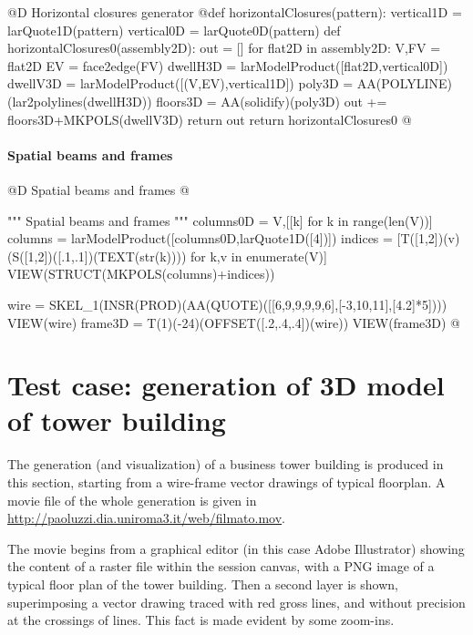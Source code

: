 \documentclass[11pt,oneside]{article}    %
\begin{document}
@D Horizontal closures generator
@{def horizontalClosures(pattern):
    vertical1D = larQuote1D(pattern)
    vertical0D = larQuote0D(pattern)
    def horizontalClosures0(assembly2D):
        out = []
        for flat2D in assembly2D:
            V,FV = flat2D
            EV = face2edge(FV)
            dwellH3D = larModelProduct([flat2D,vertical0D])
            dwellV3D = larModelProduct([(V,EV),vertical1D])
            poly3D = AA(POLYLINE)(lar2polylines(dwellH3D))
            floors3D = AA(solidify)(poly3D)
            out += floors3D+MKPOLS(dwellV3D)
        return out
    return horizontalClosures0
@}



\paragraph{Spatial beams and frames}
@D Spatial beams and frames
@{""" Spatial beams and frames """
columns0D = V,[[k] for k in range(len(V))]
columns = larModelProduct([columns0D,larQuote1D([4])])
indices = [T([1,2])(v)(S([1,2])([.1,.1])(TEXT(str(k)))) for k,v in enumerate(V)]
VIEW(STRUCT(MKPOLS(columns)+indices))

wire = SKEL_1(INSR(PROD)(AA(QUOTE)([[6,9,9,9,9,6],[-3,10,11],[4.2]*5])))
VIEW(wire)
frame3D = T(1)(-24)(OFFSET([.2,.4,.4])(wire))
VIEW(frame3D)
@}

\section{Test case: generation of 3D model of tower building}\label{sec:library}

The generation (and visualization) of a business tower building is produced in this section, starting from a wire-frame vector drawings of typical floorplan. A movie file of the whole generation is given in \href{http://paoluzzi.dia.uniroma3.it/web/filmato.mov}{http://paoluzzi.dia.uniroma3.it/web/filmato.mov}.

The movie begins from a graphical editor (in this case Adobe Illustrator) showing the content of a  raster file  within the session canvas, with a PNG image of a typical floor plan of the tower building. Then a second layer is shown, superimposing a vector drawing traced with red gross lines, and without precision at the crossings of lines. This fact is made evident by some zoom-ins. 
\end{document}
